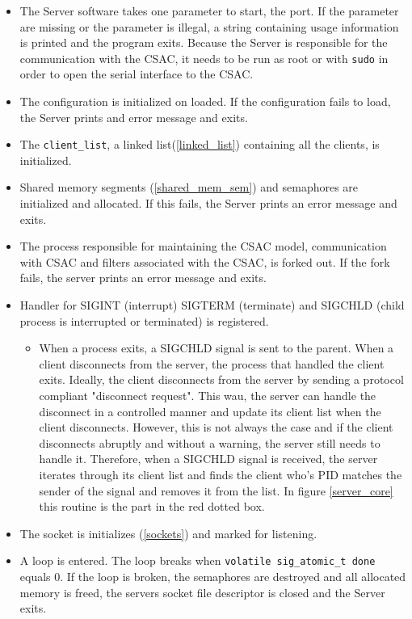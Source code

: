 \documentclass[12pt,english,a4paper]{report}
\begin{document}
\begin{itemize} %
  \item The Server software takes one parameter to start, the port. If the parameter are missing or the parameter is illegal, a string containing usage information is printed and the program exits. Because the Server is responsible for the communication with the CSAC, it needs to be run as root or with \texttt{sudo} in order to open the serial interface to the CSAC.
  \item The configuration is initialized on loaded. If the configuration fails to load, the Server prints and error message and exits.
  \item The \texttt{client\_list}, a linked list(\ref{linked_list}) containing all the clients, is initialized.
  \item Shared memory segments (\ref{shared_mem_sem}) and semaphores are initialized and allocated. If this fails, the Server prints an error message and exits.
  \item The process responsible for maintaining the CSAC model, communication with CSAC and filters associated with the CSAC, is forked out. If the fork fails, the server prints an error message and exits.
  \item Handler for SIGINT (interrupt) SIGTERM (terminate) and SIGCHLD (child process is interrupted or terminated) is registered.
  \begin{itemize}
      \item When a process exits, a SIGCHLD signal is sent to the parent. When a client disconnects from the server, the process that handled the client exits. Ideally, the client disconnects from the server by sending a protocol compliant "disconnect request". This wau, the server can handle the disconnect in a controlled manner and update its client list when the client disconnects. However, this is not always the case and if the client disconnects abruptly and without a warning, the server still needs to handle it. Therefore, when a SIGCHLD signal is received, the server iterates through its client list and finds the client who's PID matches the sender of the signal and removes it from the list. In figure \ref{server_core} this routine is the part in the red dotted box. 
  \end{itemize}
  \item The socket is initializes (\ref{sockets}) and marked for listening.
  \item A loop is entered. The loop breaks when \texttt{volatile sig\_atomic\_t done} equals 0. If the loop is broken, the semaphores are destroyed and all allocated memory is freed, the servers socket file descriptor is closed and the Server exits.

\end{itemize}
\end{document}
